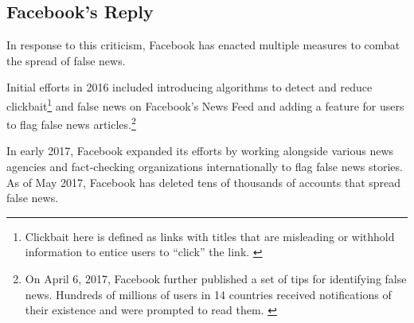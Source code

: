 \subsection{Facebook's Reply}

\par In response to this criticism, Facebook has enacted multiple measures to combat the spread of false news. \cite{fb_newsroom,fb_hoaxes_2016,guardian_tips,tc_downranks,tc_ai,telegraph_delete}

\par Initial efforts in 2016 included introducing algorithms to detect and reduce clickbait\footnote{Clickbait here is defined as links with titles that are misleading or withhold information to entice users to ``click'' the link. \cite{fb_hoaxes_2016}} and false news on Facebook's News Feed \cite{fb_hoaxes_2016} and adding a feature for users to flag false news articles.\footnote{On April 6, 2017, Facebook further published a set of tips for identifying false news. Hundreds of millions of users in 14 countries received notifications of their existence and were prompted to read them. \cite{guardian_tips}} \cite{tc_downranks} 

\par In early 2017, Facebook expanded its efforts by working alongside various news agencies and fact-checking organizations internationally to flag false news stories. \cite{guardian_steps} As of May 2017, Facebook has deleted tens of thousands of accounts that spread false news. \cite{telegraph_delete}

\vfill